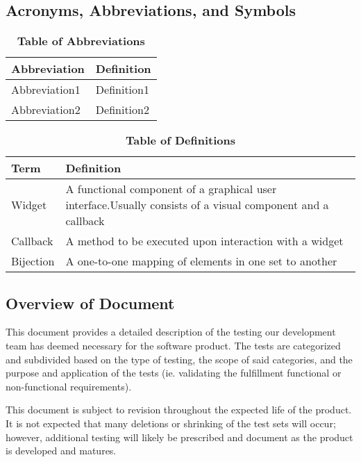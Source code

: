 \documentclass[12pt, titlepage]{article}
\begin{document}
	\subsection{Acronyms, Abbreviations, and Symbols}
	
	\begin{table}[hbp]
		\caption{\textbf{Table of Abbreviations}} \label{AbbrTable}
		\begin{tabularx}{\textwidth}{p{3cm}X}
			\toprule
			\textbf{Abbreviation} & \textbf{Definition} \\
			\midrule
			Abbreviation1 & Definition1\\
			Abbreviation2 & Definition2\\
			\bottomrule
		\end{tabularx}
	\end{table}
	\begin{table}[!htbp]
		\caption{\textbf{Table of Definitions}} \label{DefTable}
		\begin{tabularx}{\textwidth}{p{3cm}X}
			\toprule
			\textbf{Term} & \textbf{Definition}\\
			\midrule
			Widget & A functional component of a graphical user interface.\newline Usually
			consists of a visual component and a callback\\
			Callback & A method to be executed upon interaction with a widget\\
			Bijection & A one-to-one mapping of elements in one set to another\\
			\bottomrule
		\end{tabularx}
	\end{table}	
	\subsection{Overview of Document}
	\indent \indent This document provides a detailed description of the 
	testing our development team has deemed necessary for the software product. 
	The tests are categorized and subdivided based on the type of testing, the 
	scope of said categories, and the purpose and application of the tests (ie. 
	validating the fulfillment functional or non-functional requirements).\par
	This document is subject to revision throughout the expected life of the 
	product. It is not expected that many deletions or shrinking of the test 
	sets will occur; however, additional testing will likely be prescribed and 
	document as the product is developed and matures.
	
\end{document}
